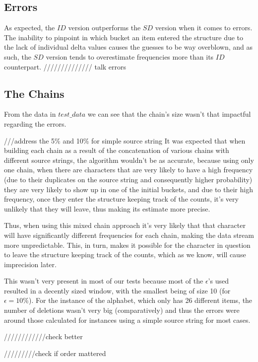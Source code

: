 \documentclass[...]{revdetua}
\begin{document}
\subsection{Errors}
As expected, the $ID$ version outperforms the $SD$ version when it comes to errors.
The inability to pinpoint in which bucket an item  entered the structure due to the lack of individual delta values causes the guesses to be way overblown, and as such, the $SD$ version tends to overestimate frequencies more than its $ID$ counterpart.
////////////// talk errors
\subsection{The Chains}
From the data in $test\_data$ we can see that the chain's size wasn't that impactful regarding the errors.\par
///address the 5\% and 10\% for simple source string
It was expected that when building each chain as a result of the concatenation of various chains with different source strings, the algorithm wouldn't be as accurate, because using only one chain, when there are characters that are very likely to have a high frequency (due to their duplicates on the source string and consequently higher probability) they are very likely to show up in one of the initial buckets, and due to their high frequency, once they enter the structure keeping track of the counts, it's very unlikely that they will leave, thus making its estimate more precise.\par 
Thus, when using this mixed chain approach it's very likely that that character will have significantly different frequencies for each chain, making the data stream more unpredictable. This, in turn, makes it possible for the character in question to leave the structure keeping track of the counts, which as we know, will cause imprecision later.\par
This wasn't very present in most of our tests because most of the $\epsilon$'s used resulted in a decently sized window, with the smallest being of size 10 (for $\epsilon=10\%$). For the instance of the alphabet, which only has 26 different items, the number of deletions wasn't very big (comparatively) and thus the errors were around those calculated for instances using  a simple source string for most cases.

////////////check better

/////////check if order mattered
\end{document}

